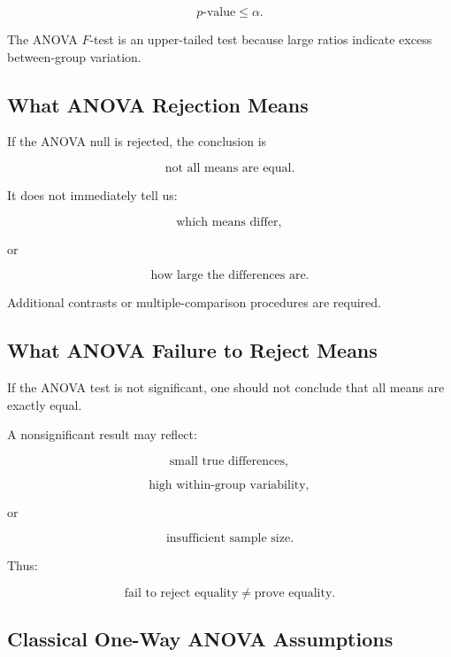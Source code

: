 \[
\boxed{
p\text{-value}
\leq
\alpha.
}
\]

The ANOVA \(F\)-test is an upper-tailed test because large ratios indicate
excess between-group variation.

\subsection{What ANOVA Rejection Means}
\label{subsec:what-anova-rejection-means}

If the ANOVA null is rejected, the conclusion is

\[
\boxed{
\text{not all means are equal}.
}
\]

It does not immediately tell us:

\[
\boxed{
\text{which means differ},
}
\]

or

\[
\boxed{
\text{how large the differences are}.
}
\]

Additional contrasts or multiple-comparison procedures are required.

\subsection{What ANOVA Failure to Reject Means}
\label{subsec:anova-fail-reject}

If the ANOVA test is not significant, one should not conclude that all
means are exactly equal.

A nonsignificant result may reflect:

\[
\boxed{
\text{small true differences},
}
\]

\[
\boxed{
\text{high within-group variability},
}
\]

or

\[
\boxed{
\text{insufficient sample size}.
}
\]

Thus:

\[
\boxed{
\text{fail to reject equality}
\neq
\text{prove equality}.
}
\]

\subsection{Classical One-Way ANOVA Assumptions}
\label{subsec:anova-assumptions}

